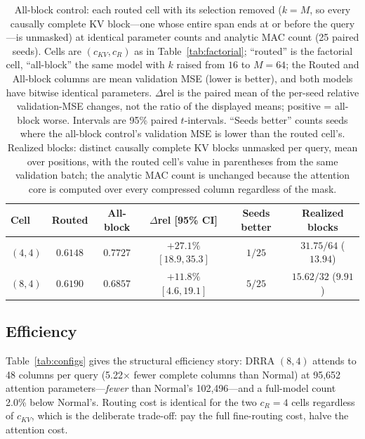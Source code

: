 \begin{table}[t]
\centering
\small
\caption{All-block control: each routed cell with its selection removed
($k=M$, so every causally complete KV block---one whose entire span ends at or
before the query---is unmasked) at identical parameter counts and analytic MAC
count (25 paired seeds). Cells are $(c_{KV},c_R)$ as in
Table~\ref{tab:factorial}; ``routed'' is the factorial cell, ``all-block'' the
same model with $k$ raised from $16$ to $M{=}64$; the Routed and All-block
columns are mean validation MSE (lower is better), and both models have
bitwise identical parameters. $\Delta$rel is the paired
mean of the per-seed relative validation-MSE changes, not the ratio of the
displayed means; positive = all-block worse. Intervals are 95\% paired
$t$-intervals. ``Seeds better'' counts seeds where the all-block control's
validation MSE is lower than the routed cell's. Realized blocks: distinct
causally complete KV blocks unmasked per query, mean over positions, with the
routed cell's value in parentheses from the same validation batch; the analytic
MAC count is unchanged because the attention core is computed over every
compressed column regardless of the mask.}
\label{tab:allblock}
\begin{tabular}{lccccc}
\toprule
Cell & Routed & All-block & $\Delta$rel [95\% CI] & Seeds better & Realized blocks \\
\midrule
$(4,4)$ & $0.6148$ & $0.7727$ & $+27.1\%$ $[18.9,35.3]$ & $1/25$ & $31.75/64$ ($13.94$) \\
$(8,4)$ & $0.6190$ & $0.6857$ & $+11.8\%$ $[4.6,19.1]$ & $5/25$ & $15.62/32$ ($9.91$) \\
\bottomrule
\end{tabular}
\end{table}

\subsection{Efficiency}
\label{sec:efficiency}
Table~\ref{tab:configs} gives the structural efficiency story: DRRA $(8,4)$
attends to 48 columns per query (5.22$\times$ fewer complete columns than Normal)
at 95{,}652 attention parameters---\emph{fewer} than Normal's 102{,}496---and
a full-model count 2.0\% below Normal's. Routing cost is identical for the
two $c_R{=}4$ cells regardless of $c_{KV}$, which is the deliberate
trade-off: pay the full fine-routing cost, halve the attention cost.

